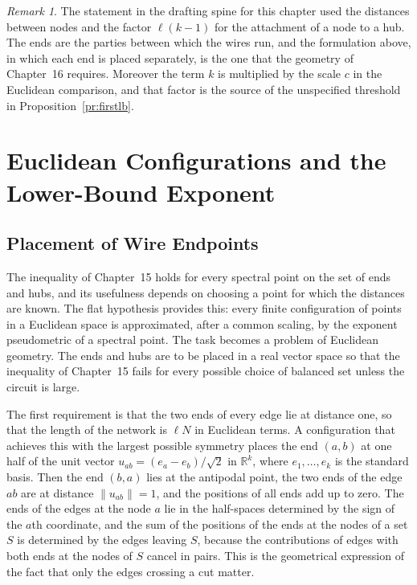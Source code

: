 \documentclass[11pt,letterpaper]{report}
\theoremstyle{plain}
\theoremstyle{definition}
\theoremstyle{remark}
\newtheorem{remark}[theorem]{Remark}
\begin{document}
\begin{remark}
The statement in the drafting spine for this chapter used the distances between nodes and the factor $\ell(k-1)$ for the attachment of a node to a hub. The ends are the parties between which the wires run, and the formulation above, in which each end is placed separately, is the one that the geometry of Chapter~16 requires. Moreover the term $k$ is multiplied by the scale $c$ in the Euclidean comparison, and that factor is the source of the unspecified threshold in Proposition~\ref{pr:firstlb}.
\end{remark}

\chapter{Euclidean Configurations and the Lower-Bound Exponent}

\section{Placement of Wire Endpoints}

The inequality of Chapter~15 holds for every spectral point on the set of ends and hubs, and its usefulness depends on choosing a point for which the distances are known. The flat hypothesis provides this: every finite configuration of points in a Euclidean space is approximated, after a common scaling, by the exponent pseudometric of a spectral point. The task becomes a problem of Euclidean geometry. The ends and hubs are to be placed in a real vector space so that the inequality of Chapter~15 fails for every possible choice of balanced set unless the circuit is large.

The first requirement is that the two ends of every edge lie at distance one, so that the length of the network is $\ell N$ in Euclidean terms. A configuration that achieves this with the largest possible symmetry places the end $(a,b)$ at one half of the unit vector $u_{ab}=(e_a-e_b)/\sqrt2$ in $\mathbb R^k$, where $e_1,\ldots,e_k$ is the standard basis. Then the end $(b,a)$ lies at the antipodal point, the two ends of the edge $ab$ are at distance $\|u_{ab}\|=1$, and the positions of all ends add up to zero. The ends of the edges at the node $a$ lie in the half-spaces determined by the sign of the $a$th coordinate, and the sum of the positions of the ends at the nodes of a set $S$ is determined by the edges leaving $S$, because the contributions of edges with both ends at the nodes of $S$ cancel in pairs. This is the geometrical expression of the fact that only the edges crossing a cut matter.
\end{document}
